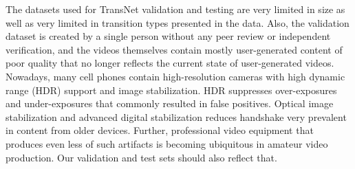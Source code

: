 
The datasets used for TransNet validation and testing are very limited in size as well as very limited in transition types presented in the data. Also, the validation dataset is created by a single person without any peer review or independent verification, and the videos themselves contain mostly user-generated content of poor quality that no longer reflects the current state of user-generated videos. Nowadays, many cell phones contain high-resolution cameras with high dynamic range (HDR) support and image stabilization. HDR suppresses over-exposures and under-exposures that commonly resulted in false positives. Optical image stabilization and advanced digital stabilization \cite{PixelStabilization} reduces handshake very prevalent in content from older devices. Further, professional video equipment that produces even less of such artifacts is becoming ubiquitous in amateur video production. Our validation and test sets should also reflect that.




